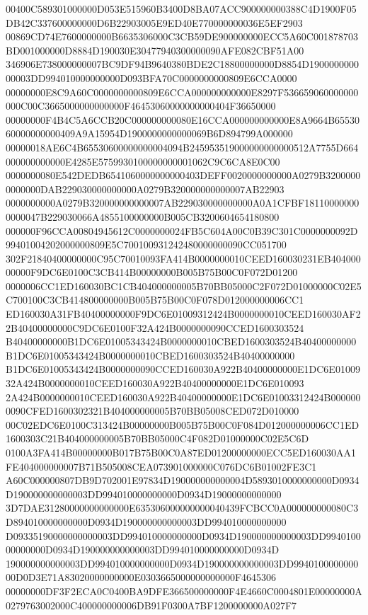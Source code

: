\documentclass[UTF8,fontset=fandol,zihao=-4,a4paper]{ctexart}
\begin{document}
{{00400C589301000000D053E515960B3400D8BA07ACC900000000388C4D1900F05DB42C337600000000D6B22903005E9ED40E770000000036E5EF2903
00869CD74E7600000000B6635306000C3CB59DE900000000ECC5A60C001878703BD001000000D8884D190030E30477940300000090AFE082CBF51A00
346906E738000000007BC9DF94B9640380BDE2C18800000000D8854D190000000000003DD994010000000000D093BFA70C0000000000809E6CCA0000
00000000E8C9A60C0000000000809E6CCA000000000000E8297F536659060000000000C00C3665000000000000F46453060000000000404F36650000
00000000F4B4C5A6CCB20C000000000080E16CCA000000000000E8A9664B6553060000000000409A9A15954D1900000000000069B6D894799A000000
00000018AE6C4B65530600000000004094B245953519000000000000512A7755D664000000000000E4285E5759930100000000001062C9C6CA8E0C00
0000000080E542DEDB6541060000000000403DEFF0020000000000A0279B32000000000000DAB229030000000000A0279B320000000000007AB22903
0000000000A0279B320000000000007AB229030000000000A0A1CFBF181100000000000047B229030066A4855100000000B005CB3200604654180800
000000F96CCA00804945612C0000000024FB5C604A00C0B39C301C0000000092D99401004202000000809E5C700100931242480000000090CC051700
302F21840400000000C95C70010093FA414B0000000010CEED160030231EB40400000000F9DC6E0100C3CB414B00000000B005B75B00C0F072D01200
0000006CC1ED160030BC1CB404000000005B70BB05000C2F072D01000000C02E5C700100C3CB414800000000B005B75B00C0F078D012000000006CC1
ED160030A31FB40400000000F9DC6E01009312424B0000000010CEED160030AF22B40400000000C9DC6E0100F32A424B0000000090CCED1600303524
B40400000000B1DC6E01005343424B0000000010CBED1600303524B40400000000B1DC6E01005343424B0000000010CBED1600303524B40400000000
B1DC6E01005343424B0000000090CCED160030A922B40400000000E1DC6E0100932A424B0000000010CEED160030A922B40400000000E1DC6E010093
2A424B0000000010CEED160030A922B40400000000E1DC6E01003312424B0000000090CFED1600302321B404000000005B70BB05008CED072D010000
00C02EDC6E0100C313424B00000000B005B75B00C0F084D012000000006CC1ED1600303C21B404000000005B70BB05000C4F082D01000000C02E5C6D
0100A3FA414B00000000B017B75B00C0A87ED01200000000ECC5ED160030AA1FE404000000007B71B505008CEA073901000000C076DC6B01002FE3C1
A60C000000807DB9D702001E97834D190000000000004D5893010000000000D0934D190000000000003DD994010000000000D0934D19000000000000
3D7DAE31280000000000000E635306000000000040439FCBCC0A000000000080C3D894010000000000D0934D190000000000003DD994010000000000
D09335190000000000003DD994010000000000D0934D190000000000003DD994010000000000D0934D190000000000003DD994010000000000D0934D
190000000000003DD994010000000000D0934D190000000000003DD994010000000000D0D3E71A83020000000000E0303665000000000000F4645306
00000000DF3F2ECA0C0400BA9DFE366500000000F4E4660C0004801E00000000A0279763002000C400000000006DB91F0300A7BF1200000000A027F7
}}
\end{document}
